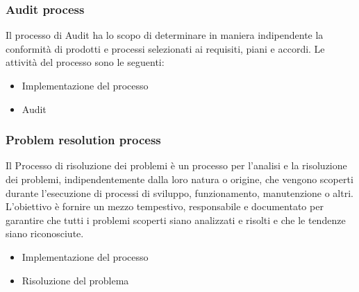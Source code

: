 \subsubsection{Audit process}
Il processo di Audit ha lo scopo di determinare in maniera indipendente la conformità di prodotti e processi selezionati ai requisiti, piani e accordi.
Le attività del processo sono le seguenti:
\begin{itemize}
\item Implementazione del processo
\item Audit
\end{itemize}

\subsubsection{Problem resolution process}
Il Processo di risoluzione dei problemi è un processo per l'analisi e la risoluzione dei problemi, indipendentemente dalla loro natura o origine, che vengono scoperti durante l'esecuzione di processi di sviluppo, funzionamento, manutenzione o altri. L'obiettivo è fornire un mezzo tempestivo, responsabile e documentato per garantire che tutti i problemi scoperti siano analizzati e risolti e che le tendenze siano riconosciute.
\begin{itemize}
\item Implementazione del processo
\item Risoluzione del problema
\end{itemize}

